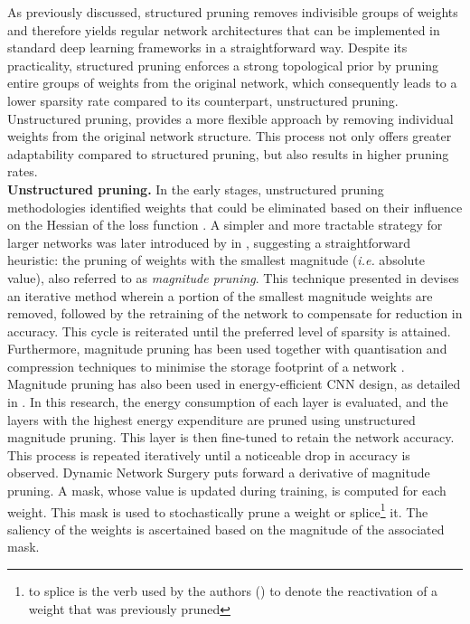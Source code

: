 As previously discussed, structured pruning removes indivisible groups of
weights and therefore yields regular network architectures that can be
implemented in standard deep learning frameworks in a straightforward way.
Despite its practicality, structured pruning enforces a strong topological prior
by pruning entire groups of weights from the original network, which consequently
leads to a lower sparsity rate compared to its counterpart, unstructured
pruning. Unstructured pruning, provides a more flexible approach by removing
individual weights from the original network structure. This process not only
offers greater adaptability compared to structured pruning, but also results in
higher pruning rates.\\

\noindent\textbf{Unstructured pruning.} In the early stages, unstructured
pruning methodologies identified weights that could be eliminated based on their
influence on the Hessian of the loss function
\cite{DBLP:conf/nips/CunDS89,DBLP:conf/icnn/HassibiSW93,DBLP:conf/nips/HassibiSW93}.
A simpler and more tractable strategy for larger networks was later introduced
by \citeauthor{DBLP:conf/nips/HanPTD15} in \cite{DBLP:conf/nips/HanPTD15},
suggesting a straightforward heuristic: the pruning of weights with the smallest
magnitude (\emph{i.e.} absolute value), also referred to as \emph{magnitude
  pruning}. This technique presented in \cite{DBLP:conf/nips/HanPTD15} devises an
iterative method wherein a portion of the smallest magnitude weights are
removed, followed by the retraining of the network to compensate for reduction
in accuracy. This cycle is reiterated until the preferred level of sparsity is
attained. Furthermore, magnitude pruning has been used together with
quantisation and compression techniques to minimise the storage footprint of a
network \cite{DBLP:journals/corr/HanMD15}. Magnitude pruning has also been used
in energy-efficient \ac{CNN} design, as detailed in
\cite{DBLP:conf/cvpr/YangCS17}. In this research, the energy consumption of each
layer is evaluated, and the layers with the highest energy expenditure are
pruned using unstructured magnitude pruning. This layer is then fine-tuned to
retain the network accuracy. This process is repeated iteratively until a
noticeable drop in accuracy is observed. Dynamic Network Surgery
\cite{DBLP:conf/nips/GuoYC16} puts forward a derivative of magnitude pruning. A
mask, whose value is updated during training, is computed for each weight. This
mask is used to stochastically prune a weight or splice\footnote{to splice is
  the verb used by the authors (\citeauthor{DBLP:conf/nips/GuoYC16}) to denote the
  reactivation of a weight that was previously pruned} it. The saliency of the
weights is ascertained based on the magnitude of the associated mask.\\

